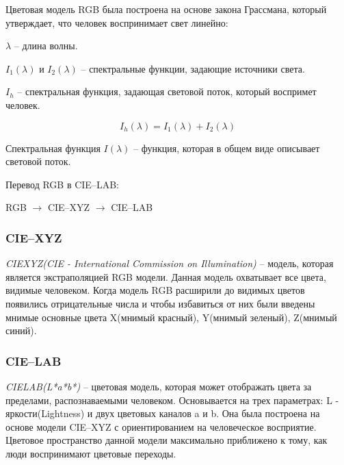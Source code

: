Цветовая модель RGB была построена на основе закона Грассмана, который утверждает, что человек воспринимает свет линейно:

$\lambda$ -- длина волны. 

$I_1(\lambda)$ и $I_2(\lambda)$ -- спектральные функции, задающие источники света.

$I_h$ -- спектральная функция, задающая световой поток, который воспримет человек.

\begin{equation}
	I_h(\lambda) = I_1(\lambda) + I_2(\lambda)
\end{equation}

Спектральная функция $I(\lambda)$ -- функция, которая в общем виде описывает световой поток.

Перевод RGB в CIE--LAB:

RGB $\rightarrow$ CIE--XYZ $\rightarrow$ CIE--LAB

\subsubsection{ CIE--XYZ}

\textit{CIEXYZ(CIE - International Commission on Illumination)} -- модель, которая является экстраполяцией RGB модели. Данная модель охватывает все цвета, видимые человеком. Когда модель RGB расширили до видимых цветов появились отрицательные числа и чтобы избавиться от них были введены мнимые основные цвета X(мнимый красный), Y(мнимый зеленый), Z(мнимый синий).

\subsubsection{ CIE--LAB}
\textit{CIELAB(L*a*b*)} -- цветовая модель, которая может отображать цвета за пределами, распознаваемыми человеком. Основывается на трех параметрах: L - яркости(Lightness) и двух цветовых каналов a и b. Она была построена на основе модели CIE--XYZ с ориентированием на человеческое восприятие. Цветовое пространство данной модели максимально приближено к тому, как люди воспринимают цветовые переходы.

\begin{figure}[ht!]
\end{figure}

